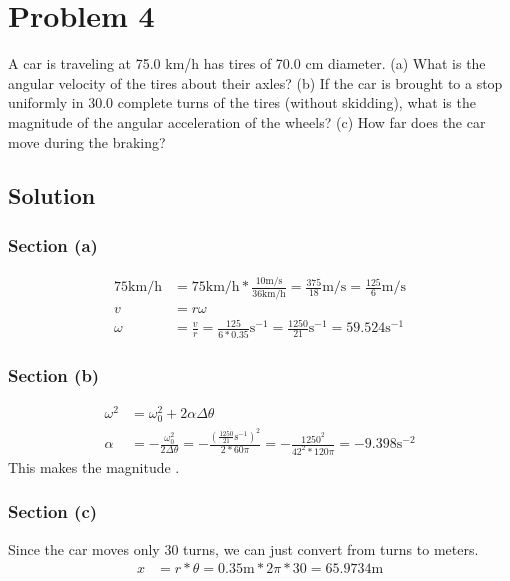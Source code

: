 \documentclass[12pt]{article}
\begin{document}
\pagebreak
\section{Problem 4}
A car is traveling at 75.0 km/h has tires of 70.0 cm diameter. (a) What is the angular velocity of the tires about their axles? (b) If the car is brought to a stop uniformly in 30.0 complete turns of the tires (without skidding), what is the magnitude of the angular acceleration of the wheels? (c) How far does the car move during the braking?

\subsection{Solution}
\subsubsection{Section (a)}
\begin{align}
    75\unit{\kilo\meter/\hour}  &=  75 \unit{\kilo\meter/\hour} * \frac{10\unit{\meter/\second}}{36\unit{\kilo\meter/\hour}}
        =   \frac{375}{18}\unit{\meter/\second}
        =   \frac{125}{6}\unit{\meter/\second}\\
    v   &=  r \omega\\
    \omega  &=  \frac{v}{r}
        =   \frac{125}{6*0.35}\unit{\second^{-1}}
        =   \frac{1250}{21}\unit{\second^{-1}}
        =   \boxed{59.524\unit{\second^{-1}}}
\end{align}

\subsubsection{Section (b)}
\begin{align}
    \omega^2    &=  \omega_0^2  +   2\alpha \Delta\theta\\
    \alpha  &=  -\frac{\omega_0^2}{2\Delta\theta}
        =   -\frac{\left(\frac{1250}{21}\unit{\second^{-1}}\right)^2}{2*60\pi}
        =   -\frac{1250^2}{42^2*120\pi}
        =   -9.398 \unit{\second^{-2}}
\end{align}
This makes the magnitude .

\subsubsection{Section (c)}
Since the car moves only 30 turns, we can just convert from turns to meters.
\begin{align}
    x   &=  r*\theta
        =   0.35\unit{\meter}*2\pi*30
        =   \boxed{65.9734\unit{\meter}}
\end{align}
\end{document}
